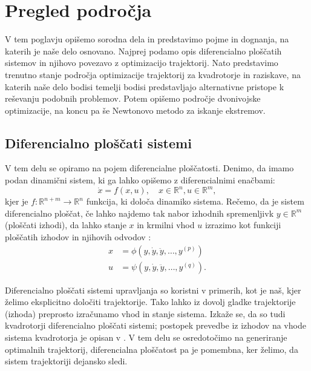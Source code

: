 \documentclass[isrm2, tisk]{fmfdelo}
\begin{document}
\section{Pregled področja}
\label{sec:pregled_podrocja}

V tem poglavju opišemo sorodna dela in predstavimo pojme in dognanja, na katerih je naše delo osnovano. Najprej podamo opis diferencialno ploščatih sistemov in njihovo povezavo z optimizacijo trajektorij. Nato predstavimo trenutno stanje področja optimizacije trajektorij za kvadrotorje in raziskave, na katerih naše delo bodisi temelji bodisi predstavljajo alternativne pristope k reševanju podobnih problemov. Potem opišemo področje dvonivojske optimizacije, na koncu pa še Newtonovo metodo za iskanje ekstremov.

\subsection{Diferencialno ploščati sistemi}
V tem delu se opiramo na pojem diferencialne ploščatosti. Denimo, da imamo podan dinamični sistem, ki ga lahko opišemo z diferencialnimi enačbami:
\begin{equation}
    \dot{x} = f(x, u), \quad x \in \mathbb{R}^n, u \in \mathbb{R}^m,
\end{equation}
kjer je $f: \mathbb{R}^{n+m} \to \mathbb{R}^n$ funkcija, ki določa dinamiko sistema. Rečemo, da je sistem diferencialno ploščat, če lahko najdemo tak nabor izhodnih spremenljivk $y \in \mathbb{R}^m$ (ploščati izhodi), da lahko stanje $x$ in krmilni vhod $u$ izrazimo kot funkciji ploščatih izhodov in njihovih odvodov \cite{murray1995differential}:
\begin{align}
    x &= \phi(y, \dot{y}, \ddot{y}, \dots, y^{(p)}) \\
    u &= \psi(y, \dot{y}, \ddot{y}, \dots, y^{(q)}).
\end{align}

Diferencialno ploščati sistemi upravljanja so koristni v primerih, kot je naš, kjer želimo eksplicitno določiti trajektorije. Tako lahko iz dovolj gladke trajektorije (izhoda) preprosto izračunamo vhod in stanje sistema. Izkaže se, da so tudi kvadrotorji diferencialno ploščati sistemi; postopek prevedbe iz izhodov na vhode sistema kvadrotorja je opisan v \cite{mellinger2011minimum}. V tem delu se osredotočimo na generiranje optimalnih trajektorij, diferencialna ploščatost pa je pomembna, ker želimo, da sistem trajektoriji dejansko sledi.
\end{document}
